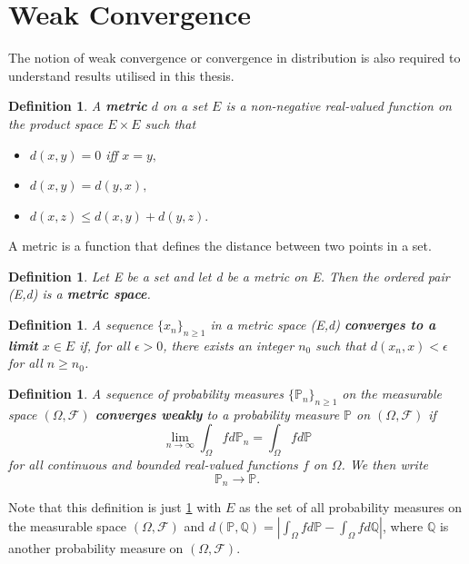 \documentclass[honours,12pt]{UNSWthesis}
\newcommand{\PP}{\mathbb{P}}
\newcommand{\1}{\mathbf 1}
\newcommand{\FF}{\mathcal{F}}
\newtheorem{definition}[theorem]{Definition}
\numberwithin{equation}{section}
\theoremstyle{definition}
\theoremstyle{remark}
\begin{document}
\section{Weak Convergence}
The notion of weak convergence or convergence in distribution is also required to understand results utilised in this thesis.\\

\begin{definition}
A \textbf{metric} $d$ on a set $E$ is a non-negative real-valued function on the product space $E\times E$ such that
	\begin{itemize}
		\item $d(x,y)=0$ iff $x=y,$
		\item $d(x,y)=d(y,x),$
		\item $d(x,z) \leq d(x,y)+d(y,z).$
	\end{itemize}
\end{definition}
\noindent A metric is a function that defines the distance between two points in a set.\\

\begin{definition}
Let E be a set and let d be a metric on E. Then the ordered pair (E,d) is a \textbf{metric space}.\\
\end{definition}

\begin{definition}\label{def:metricConvergence}
A sequence $\{x_n\}_{n\geq1}$ in a metric space (E,d) \textbf{converges to a limit} $x\in E$ if, for all $\epsilon>0$, there exists an integer $n_0$ such that $d(x_n,x)<\epsilon$ for all $n\geq n_0$.\\
\end{definition}

\begin{definition}
A sequence of probability measures $\{\PP_n\}_{n \geq 1}$ on the measurable space $(\Omega, \FF)$ \textbf{converges weakly} to a probability measure $\PP$ on $(\Omega, \FF)$ if
\[
\lim_{n\rightarrow \infty} \int_\Omega fd\PP_n = \int_\Omega fd\PP
\]
for all continuous and bounded real-valued functions $f$ on $\Omega$. We then write \[\PP_n\rightarrow\PP.\]
\end{definition}
\noindent Note that this definition is just \ref{def:metricConvergence} with $E$ as the set of all probability measures on the measurable space $(\Omega, \FF)$ and $d(\PP,\mathbb{Q})=|\int_\Omega fd\PP- \int_\Omega fd\mathbb{Q}|$, where $\mathbb{Q}$ is another probability measure on $(\Omega, \FF).$\\
\end{document}
